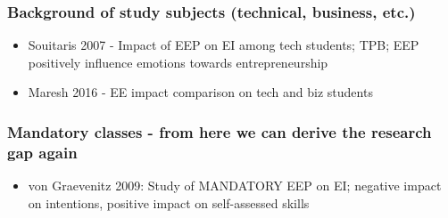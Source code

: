 \subsubsection{Background of study subjects (technical, business, etc.)}

\begin{itemize}
\item Souitaris 2007 - Impact of EEP on EI among tech students; TPB; EEP positively influence emotions towards entrepreneurship
\item Maresh 2016 - EE impact comparison on tech and biz students
\end{itemize}

\subsubsection{Mandatory classes - from here we can derive the research gap again}
\begin{itemize}
\item von Graevenitz 2009: Study of MANDATORY EEP on EI; negative impact on intentions, positive impact on self-assessed skills
\end{itemize}